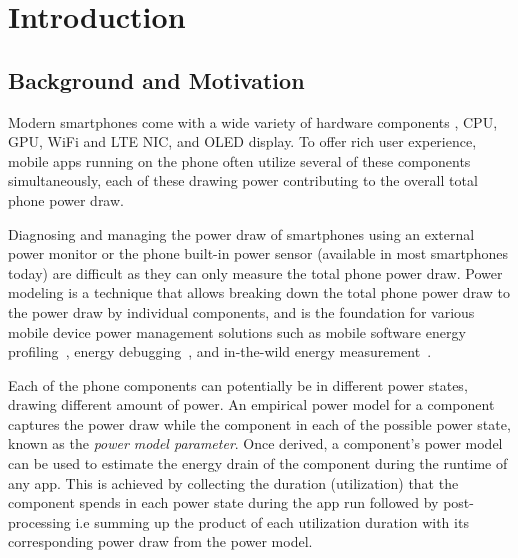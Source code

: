 \section{Introduction}
\label{sec:motivation}

\subsection{Background and Motivation}
\label{subsec:back}




Modern smartphones come with a wide variety of hardware components
, \eg CPU, GPU, WiFi and LTE NIC, and OLED display. To offer rich 
user experience, mobile apps running on the phone often utilize 
several of these components simultaneously, each of these 
drawing power contributing  to the overall total phone power draw.

Diagnosing and managing the power draw of smartphones using an external power monitor or the phone 
built-in power sensor  (available in most smartphones today)
are difficult as they can only measure the total phone power draw.
Power modeling is a technique that allows breaking down the 
total phone power draw to the power draw by individual components, 
and is the foundation for various mobile device power
management solutions such
as mobile software energy profiling~\cite{flinn:1999,shye2009into,zhang2010accurate,sesame:2011,pathak2012energy,appscope,ding2017gfxdoctor,facebookbatterymetrics}, energy debugging~\cite{ma2013edoctor,benerjee:2014}, and in-the-wild energy measurement~\cite{chen:sigm2015,androidbatterystats,androidvitals}.  

{
Each of the phone components can potentially be 
in different power states, drawing different amount of power. 
An empirical power model for a component captures the power 
draw while the component in each of the possible power state, known as  the {\em power model parameter}.
%
Once derived, a component’s power model can be used to estimate 
the energy drain of the component during the runtime of any app. 
This is achieved by collecting the duration (utilization) that 
the component spends in each power state during the app run 
followed by post-processing i.e summing up the product of 
each utilization  duration with its corresponding power draw from the power model.
}

